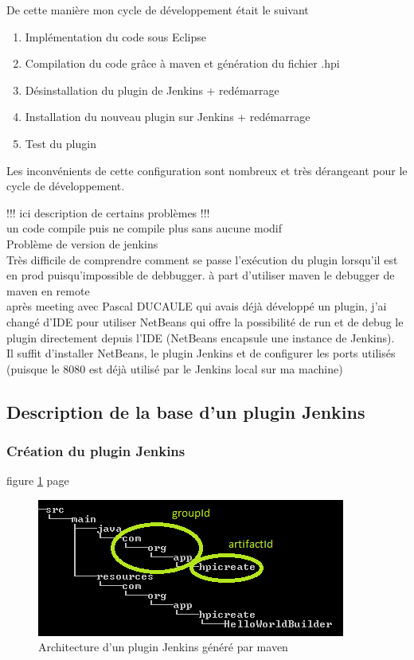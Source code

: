 De cette manière mon cycle de développement était le suivant

\begin{enumerate}
	\item Implémentation du code sous Eclipse
	\item Compilation du code grâce à maven et génération du fichier .hpi
	\item Désinstallation du plugin de Jenkins + redémarrage
	\item Installation du nouveau plugin sur Jenkins + redémarrage
	\item Test du plugin
\end{enumerate}
Les inconvénients de cette configuration sont nombreux et très dérangeant pour le cycle de développement.

!!! ici description de certains problèmes !!! \\
un code compile puis ne compile plus sans aucune modif\\
Problème de version de jenkins\\
Très difficile de comprendre comment se passe l'exécution du plugin lorsqu'il est en prod puisqu'impossible de debbugger. à part d'utiliser maven le debugger de maven en remote\\


après meeting avec Pascal DUCAULE qui avais déjà développé un plugin, j'ai changé d'IDE pour utiliser NetBeans qui offre la possibilité de run et de debug le plugin directement depuis l'IDE (NetBeans encapsule une instance de Jenkins). \\
Il suffit d'installer NetBeans, le plugin Jenkins et de configurer les ports utilisés (puisque le 8080 est déjà utilisé par le Jenkins local sur ma machine)



\subsection{Description de la base d'un plugin Jenkins}
\subsubsection{Création du plugin Jenkins}


figure \ref{figure:hpiCreate} page \pageref{figure:hpiCreate}

\begin{figure}[!h]%
  \centering
      \includegraphics{images/hpiCreate.png}
  \caption{Architecture d'un plugin Jenkins généré par maven}
	\label{figure:hpiCreate}
\end{figure}

